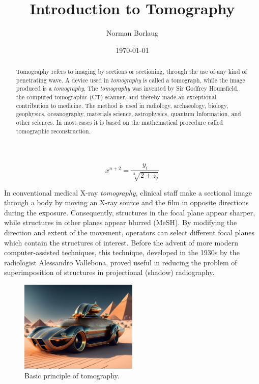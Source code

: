 \documentclass[a4paper,twoside,onecolumn]{report}
\author{Norman Borlaug}
\title{Introduction to Tomography}
\date{\today}
\begin{document}
    \maketitle

    \begin{abstract}
        Tomography refers to imaging by sections or sectioning, through
        the use of any kind of penetrating wave. A device used in
        \emph{tomography} is called a tomograph, while the image produced is a
        \emph{tomography}. The \emph{tomography} was invented by Sir Godfrey Hounsfield,
        the computed tomographic (CT) scanner, and thereby made an
        exceptional contribution to medicine. The method is used in
        radiology, archaeology, biology, geophysics, oceanography,
        materials science, astrophysics, quantum Information, and other
        sciences. In most cases it is based on the mathematical
        procedure called tomographic reconstruction.
    \end{abstract}

	\begin{equation}
		x^{n + 2} = \frac{y_{i}}{\sqrt[3]{2 + z_{j}}}
	\end{equation}

    In conventional medical X-ray \emph{tomography}, clinical staff make a sectional
    image through a body by moving an X-ray source and the film in opposite
    directions during the exposure. Consequently, structures in the focal plane
    appear sharper, while structures in other planes appear blurred (MeSH).
    By modifying the direction and extent of the movement, operators can select
    different focal planes which contain the structures of interest. Before the
    advent of more modern computer-assisted techniques, this technique,
    developed in the 1930s by the radiologist Alessandro Vallebona, proved
    useful in reducing the problem of superimposition of structures in
    projectional (shadow) radiography.
	\begin{figure}[h]
		\centering
		\includegraphics[width=0.5\textwidth]{picture1.jpg}
		\caption{Basic principle of tomography.}
	\end{figure}
\end{document}
